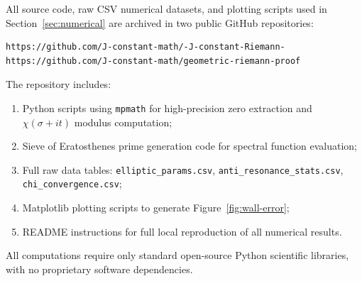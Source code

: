 \documentclass[10pt,reqno]{article}
\begin{document}
All source code, raw CSV numerical datasets, and plotting scripts used in Section~\ref{sec:numerical} are archived in two public GitHub repositories:
\begin{verbatim}
https://github.com/J-constant-math/-J-constant-Riemann-
https://github.com/J-constant-math/geometric-riemann-proof
\end{verbatim}
The repository includes:
\begin{enumerate}
\item Python scripts using \texttt{mpmath} for high-precision zero extraction and $\chi(\sigma+it)$ modulus computation;
\item Sieve of Eratosthenes prime generation code for spectral function evaluation;
\item Full raw data tables: \texttt{elliptic\_params.csv}, \texttt{anti\_resonance\_stats.csv}, \texttt{chi\_convergence.csv};
\item Matplotlib plotting scripts to generate Figure~\ref{fig:wall-error};
\item README instructions for full local reproduction of all numerical results.
\end{enumerate}
All computations require only standard open-source Python scientific libraries, with no proprietary software dependencies.
\end{document}
